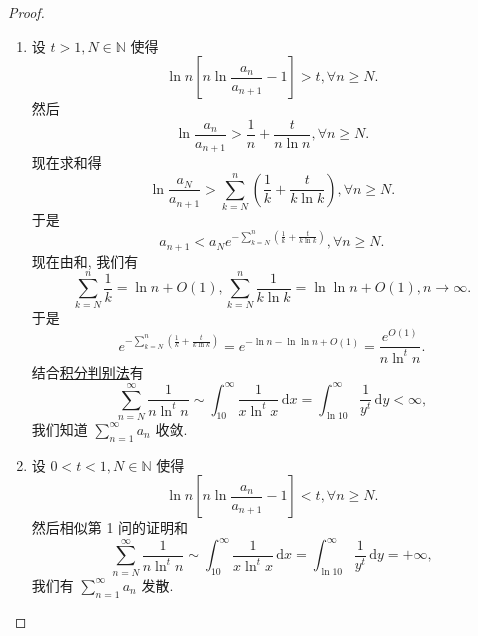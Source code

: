 \documentclass[../../main.tex]{subfiles}%
\begin{document}
\begin{proof}
\begin{enumerate}
\item 设 \( t > 1, N \in \mathbb{N} \) 使得
\[
\ln n \left[ n \ln \frac{a_n}{a_{n + 1}} - 1 \right] > t, \forall n \geqslant N.
\]
然后
\[
\ln \frac{a_n}{a_{n + 1}} > \frac{1}{n} + \frac{t}{n \ln n}, \forall n \geqslant N.
\]
现在求和得
\[
\ln \frac{a_N}{a_{n + 1}} > \sum_{k=N}^n \left( \frac{1}{k} + \frac{t}{k \ln k} \right), \forall n \geqslant N.
\]
于是
\[
a_{n + 1} < a_N e^{-\sum\limits_{k=N}^n \left( \frac{1}{k} + \frac{t}{k \ln k} \right)}, \forall n \geqslant N.
\]
现在由和, 我们有
\[
\sum_{k=N}^n \frac{1}{k} = \ln n + O(1), \sum_{k=N}^n \frac{1}{k \ln k} = \ln \ln n + O(1), n \to \infty.
\]
于是
\[
e^{-\sum\limits_{k=N}^n \left( \frac{1}{k} + \frac{t}{k \ln k} \right)} = e^{-\ln n - \ln \ln n + O(1)} = \frac{e^{O(1)}}{n \ln^t n}.
\]
结合\hyperref[theorem:积分判别法]{积分判别法}有
\[
\sum_{n=N}^\infty \frac{1}{n \ln^t n} \sim \int_{10}^\infty \frac{1}{x \ln^t x} \, \mathrm{d}x = \int_{\ln 10}^\infty \frac{1}{y^t} \, \mathrm{d}y < \infty,
\]
我们知道 \( \sum_{n=1}^\infty a_n \) 收敛.

\item 设 \( 0 < t < 1, N \in \mathbb{N} \) 使得
\[
\ln n \left[ n \ln \frac{a_n}{a_{n + 1}} - 1 \right] < t, \forall n \geqslant N.
\]
然后相似第 1 问的证明和
\[
\sum_{n=N}^\infty \frac{1}{n \ln^t n} \sim \int_{10}^\infty \frac{1}{x \ln^t x} \, \mathrm{d}x = \int_{\ln 10}^\infty \frac{1}{y^t} \, \mathrm{d}y = +\infty,
\]
我们有 \( \sum_{n=1}^\infty a_n \) 发散.
\end{enumerate}

\end{proof}
\end{document}
